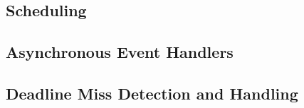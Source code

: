 \subsection{Scheduling} %
\label{sub:schedulingobjects}


\subsection{Asynchronous Event Handlers} %
\label{sub:asynchronous_event_handlers}








\subsection{Deadline Miss Detection and Handling} %
\label{sub:deadline_miss_detection_and_handling}

